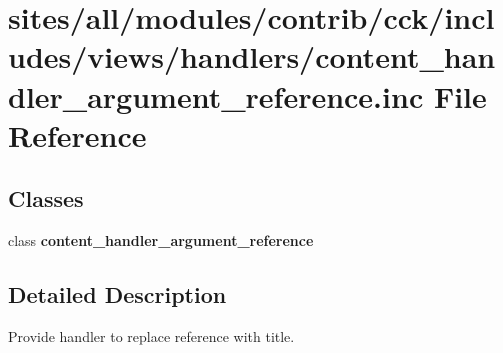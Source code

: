 \hypertarget{content__handler__argument__reference_8inc}{
\section{sites/all/modules/contrib/cck/includes/views/handlers/content\_\-handler\_\-argument\_\-reference.inc File Reference}
\label{content__handler__argument__reference_8inc}
}
\subsection*{Classes}
\begin{CompactItemize}
\item 
class \textbf{content\_\-handler\_\-argument\_\-reference}
\end{CompactItemize}


\subsection{Detailed Description}
Provide handler to replace reference with title. 